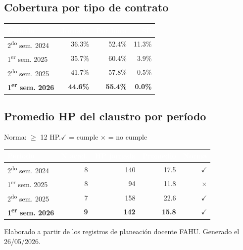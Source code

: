 \documentclass[11pt, a4paper]{article}
\begin{document}
\subsection{Cobertura por tipo de contrato}

\begin{tabular}{lrrr}
\toprule
\rowcolor{usachDark} \textbf{\textcolor{white}{Periodo}} & \textbf{\textcolor{white}{Jornada}} & \textbf{\textcolor{white}{Por hora}} & \textbf{\textcolor{white}{SP}} \\
\midrule
2\textsuperscript{do} sem. 2024 & 36.3\% & 52.4\% & 11.3\% \\
\rowcolor{rowEven}1\textsuperscript{er} sem. 2025 & 35.7\% & 60.4\% & 3.9\% \\
2\textsuperscript{do} sem. 2025 & 41.7\% & 57.8\% & 0.5\% \\
\rowcolor{rowHighlight}\textbf{1\textsuperscript{er} sem. 2026} & \textbf{44.6\%} & \textbf{55.4\%} & \textbf{0.0\%} \\
\bottomrule
\end{tabular}

\subsection{Promedio HP del claustro por período}

Norma: $\geq$ 12 HP.\quad$\checkmark$ = cumple \quad $\times$ = no cumple

\begin{tabular}{lrrrr}
\toprule
\rowcolor{usachDark} \textbf{\textcolor{white}{Periodo}} & \textbf{\textcolor{white}{N acad.}} & \textbf{\textcolor{white}{HP jornada}} & \textbf{\textcolor{white}{Promedio}} & \textbf{\textcolor{white}{Norma}} \\
\midrule
2\textsuperscript{do} sem. 2024 & 8 & 140 & 17.5 & $\checkmark$ \\
\rowcolor{rowEven}1\textsuperscript{er} sem. 2025 & 8 & 94 & 11.8 & $\times$ \\
2\textsuperscript{do} sem. 2025 & 7 & 158 & 22.6 & $\checkmark$ \\
\rowcolor{rowHighlight}\textbf{1\textsuperscript{er} sem. 2026} & \textbf{9} & \textbf{142} & \textbf{15.8} & \textbf{$\checkmark$} \\
\bottomrule
\end{tabular}

\vfill
{\footnotesize\color{gray} Elaborado a partir de los registros de planeación docente FAHU. Generado el 26/05/2026.}
\end{document}
